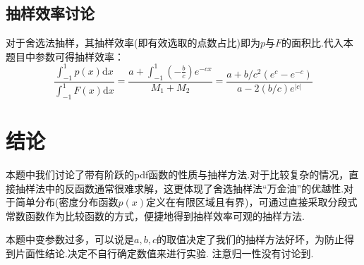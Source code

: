 \documentclass[12pt,a4paper,utf8]{ctexart}
\begin{document}
\subsection{抽样效率讨论}

对于舍选法抽样，其抽样效率(即有效选取的点数占比)即为$p$与$F$的面积比.代入本题目中参数可得抽样效率：
\begin{equation}
    \frac{\int _{-1}^{1}p(x) \textrm{d}x}{\int _{-1} ^1 F(x) \textrm{d}x} 
    = \frac{a + \int _{-1} ^1 (- \frac{b}{c})e^{-cx}}{M_1+M_2}
    = \frac{a+b/c^2(e^c-e^{-c})}{a - 2(b/c) e^{|c|}}
\end{equation}
\section{结论}

本题中我们讨论了带有阶跃的pdf函数的性质与抽样方法.对于比较复杂的情况，直接抽样法中的反函数通常很难求解，这更体现了舍选抽样法“万金油”的优越性.对于简单分布(密度分布函数$p(x)$定义在有限区域且有界)，可通过直接采取分段式常数函数作为比较函数的方式，便捷地得到抽样效率可观的抽样方法.

本题中变参数过多，可以说是$a,b,c$的取值决定了我们的抽样方法好坏，为防止得到片面性结论.决定不自行确定数值来进行实验.
\color{red} 注意归一性没有讨论到.
\end{document}
